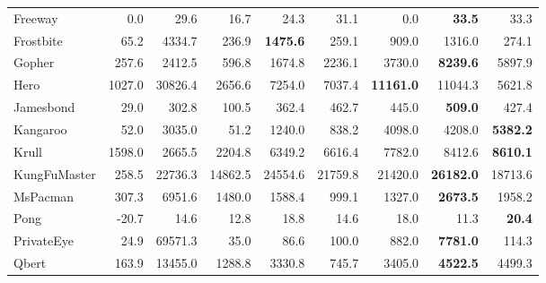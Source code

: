 \begin{table*}[h]
\begin{center}
\begin{small}
{\begin{tabular}{lrr rrrrrr}
Freeway              &  0.0       &  29.6      &  16.7      &  24.3               &  31.1              &  0.0                &  \textbf{33.5}      &  33.3                     \\
Frostbite            &  65.2      &  4334.7    &  236.9     &  \textbf{1475.6}    &  259.1             &  909.0              &  1316.0             &  274.1                    \\
Gopher               &  257.6     &  2412.5    &  596.8     &  1674.8             &  2236.1            &  3730.0             &  \textbf{8239.6}    &  5897.9                   \\
Hero                 &  1027.0    &  30826.4   &  2656.6    &  7254.0             &  7037.4            &  \textbf{11161.0}   &  11044.3            &  5621.8                   \\
Jamesbond            &  29.0      &  302.8     &  100.5     &  362.4              &  462.7             &  445.0              &  \textbf{509.0}     &  427.4                    \\
Kangaroo             &  52.0      &  3035.0    &  51.2      &  1240.0             &  838.2             &  4098.0             &  4208.0             &  \textbf{5382.2}          \\
Krull                &  1598.0    &  2665.5    &  2204.8    &  6349.2             &  6616.4            &  7782.0             &  8412.6             &  \textbf{8610.1}          \\
KungFuMaster         &  258.5     &  22736.3   &  14862.5   &  24554.6            &  21759.8           &  21420.0            &  \textbf{26182.0}   &  18713.6                  \\
MsPacman             &  307.3     &  6951.6    &  1480.0    &  1588.4             &  999.1             &  1327.0             &  \textbf{2673.5}    &  1958.2                   \\
Pong                 &  -20.7     &  14.6      &  12.8      &  18.8               &  14.6              &  18.0               &  11.3               &  \textbf{20.4}            \\
PrivateEye           &  24.9      &  69571.3   &  35.0      &  86.6               &  100.0             &  882.0              &  \textbf{7781.0}    &  114.3                    \\
Qbert                &  163.9     &  13455.0   &  1288.8    &  3330.8             &  745.7             &  3405.0             &  \textbf{4522.5}    &  4499.3                   \\

\end{tabular}}
\end{small}
\end{center}
\end{table*}
